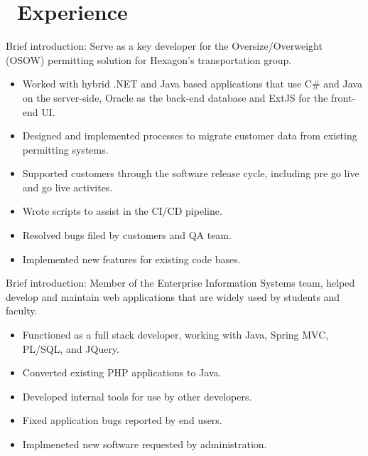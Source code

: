 \documentclass{resume}
\begin{document}



\section{\faUsers\ Experience}
\role{Software Analyst}

Brief introduction: Serve as a key developer for the Oversize/Overweight (OSOW) permitting solution for Hexagon's transportation group.
\begin{itemize}
  \item Worked with hybrid .NET and Java based applications that use C\# and Java on the server-side, Oracle as the back-end database and ExtJS for the front-end UI.
  \item Designed and implemented processes to migrate customer data from existing permitting systems.
  \item Supported customers through the software release cycle, including pre go live and go live activites.
  \item Wrote scripts to assist in the CI/CD pipeline.
  \item Resolved bugs filed by customers and QA team.
  \item Implemented new features for existing code bases.
\end{itemize}


Brief introduction: Member of the Enterprise Information Systems team, helped develop and maintain web applications that are widely used by students and faculty.
\begin{itemize}
  \item Functioned as a full stack developer, working with Java, Spring MVC, PL/SQL, and JQuery.
  \item Converted existing PHP applications to Java.
  \item Developed internal tools for use by other developers.
  \item Fixed application bugs reported by end users.
  \item Implmeneted new software requested by administration.
\end{itemize}
\end{document}
